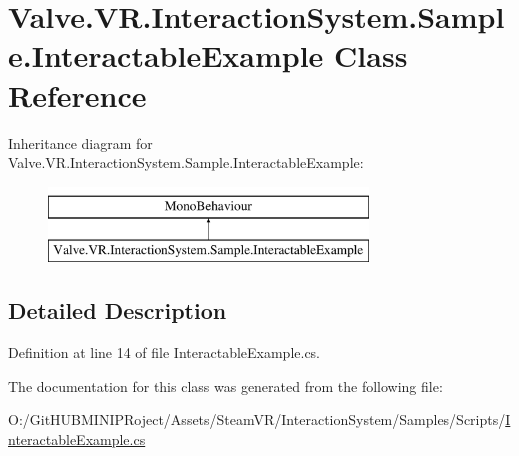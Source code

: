 \hypertarget{class_valve_1_1_v_r_1_1_interaction_system_1_1_sample_1_1_interactable_example}{}\section{Valve.\+V\+R.\+Interaction\+System.\+Sample.\+Interactable\+Example Class Reference}
\label{class_valve_1_1_v_r_1_1_interaction_system_1_1_sample_1_1_interactable_example}
Inheritance diagram for Valve.\+V\+R.\+Interaction\+System.\+Sample.\+Interactable\+Example\+:\begin{figure}[H]
\begin{center}
\leavevmode
\includegraphics[height=2.000000cm]{class_valve_1_1_v_r_1_1_interaction_system_1_1_sample_1_1_interactable_example}
\end{center}
\end{figure}


\subsection{Detailed Description}


Definition at line 14 of file Interactable\+Example.\+cs.



The documentation for this class was generated from the following file\+:\begin{DoxyCompactItemize}
\item 
O\+:/\+Git\+H\+U\+B\+M\+I\+N\+I\+P\+Roject/\+Assets/\+Steam\+V\+R/\+Interaction\+System/\+Samples/\+Scripts/\mbox{\hyperlink{_interactable_example_8cs}{Interactable\+Example.\+cs}}\end{DoxyCompactItemize}
